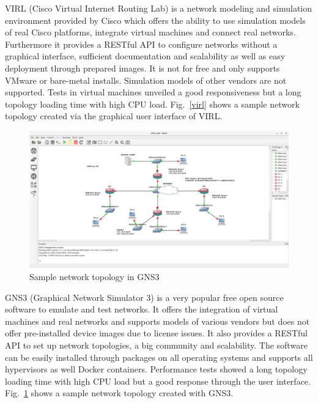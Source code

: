 \documentclass[conference]{IEEEtran}
\begin{document}
VIRL (Cisco Virtual Internet Routing Lab) is a network modeling and simulation environment provided by Cisco which offers the ability to use simulation models of real Cisco platforms, integrate virtual machines and connect real networks. Furthermore it provides a RESTful API to configure networks without a graphical interface, sufficient documentation and scalability as well as easy deployment through prepared images. It is not for free and only supports VMware or bare-metal installs. Simulation models of other vendors are not supported. Tests in virtual machines unveiled a good responsiveness but a long topology loading time with high CPU load. Fig.~\ref{virl} shows a sample network topology created via the graphical user interface of VIRL.  \cite{b1} \cite{b3}

\newpage

\begin{figure}[htbp]
\centerline{\includegraphics[scale=0.13]{gns3.png}}
\caption{Sample network topology in GNS3 \cite{b4}}
\label{gns3}
\end{figure}

GNS3 (Graphical Network Simulator 3) is a very popular free open source software to emulate and test networks. It offers the integration of virtual machines and real networks and supports models of various vendors but does not offer pre-installed device images due to license issues. It also provides a RESTful API to set up network topologies, a big community and scalability. The software can be easily installed through packages on all operating systems and supports all hypervisors as well Docker containers. Performance tests showed a long topology loading time with high CPU load but a good response through the user interface. Fig.~\ref{gns3} shows a sample network topology created with GNS3.  \cite{b1} \cite{b5}
\end{document}
